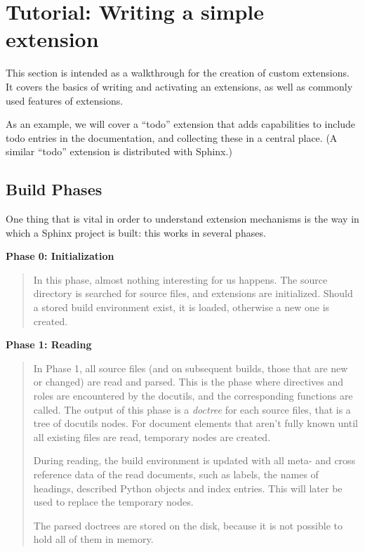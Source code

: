 \documentclass[letterpaper,10pt,english]{sphinxmanual}
\begin{document}
\section{Tutorial: Writing a simple extension}
\label{ext/tutorial:tutorial-writing-a-simple-extension}\label{ext/tutorial:exttut}\label{ext/tutorial::doc}
This section is intended as a walkthrough for the creation of custom extensions.
It covers the basics of writing and activating an extensions, as well as
commonly used features of extensions.

As an example, we will cover a ``todo'' extension that adds capabilities to
include todo entries in the documentation, and collecting these in a central
place.  (A similar ``todo'' extension is distributed with Sphinx.)


\subsection{Build Phases}
\label{ext/tutorial:build-phases}
One thing that is vital in order to understand extension mechanisms is the way
in which a Sphinx project is built: this works in several phases.

\textbf{Phase 0: Initialization}
\begin{quote}

In this phase, almost nothing interesting for us happens.  The source
directory is searched for source files, and extensions are initialized.
Should a stored build environment exist, it is loaded, otherwise a new one is
created.
\end{quote}

\textbf{Phase 1: Reading}
\begin{quote}

In Phase 1, all source files (and on subsequent builds, those that are new or
changed) are read and parsed.  This is the phase where directives and roles
are encountered by the docutils, and the corresponding functions are called.
The output of this phase is a \emph{doctree} for each source files, that is a tree
of docutils nodes.  For document elements that aren't fully known until all
existing files are read, temporary nodes are created.

During reading, the build environment is updated with all meta- and cross
reference data of the read documents, such as labels, the names of headings,
described Python objects and index entries.  This will later be used to
replace the temporary nodes.

The parsed doctrees are stored on the disk, because it is not possible to
hold all of them in memory.
\end{quote}
\end{document}
